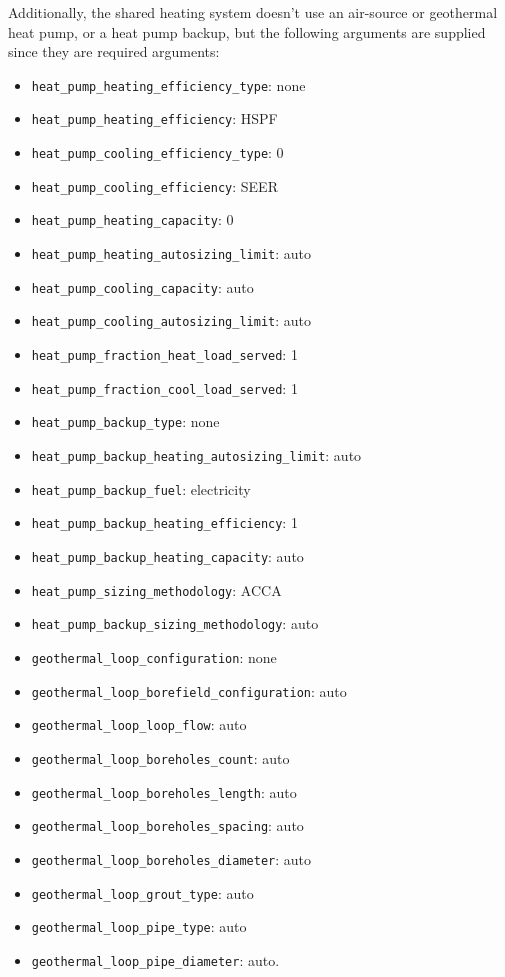 Additionally, the shared heating system doesn't use an air-source or geothermal heat pump, or a heat pump backup, but the following arguments are supplied since they are required arguments:
\begin{itemize}
    \item \texttt{heat\_pump\_heating\_efficiency\_type}: none
    \item \texttt{heat\_pump\_heating\_efficiency}: HSPF
    \item \texttt{heat\_pump\_cooling\_efficiency\_type}: 0
    \item \texttt{heat\_pump\_cooling\_efficiency}: SEER
    \item \texttt{heat\_pump\_heating\_capacity}: 0
    \item \texttt{heat\_pump\_heating\_autosizing\_limit}: auto
    \item \texttt{heat\_pump\_cooling\_capacity}: auto
    \item \texttt{heat\_pump\_cooling\_autosizing\_limit}: auto
    \item \texttt{heat\_pump\_fraction\_heat\_load\_served}: 1
    \item \texttt{heat\_pump\_fraction\_cool\_load\_served}: 1
    \item \texttt{heat\_pump\_backup\_type}: none
    \item \texttt{heat\_pump\_backup\_heating\_autosizing\_limit}: auto
    \item \texttt{heat\_pump\_backup\_fuel}: electricity
    \item \texttt{heat\_pump\_backup\_heating\_efficiency}: 1
    \item \texttt{heat\_pump\_backup\_heating\_capacity}: auto
    \item \texttt{heat\_pump\_sizing\_methodology}: ACCA
    \item \texttt{heat\_pump\_backup\_sizing\_methodology}: auto
    \item \texttt{geothermal\_loop\_configuration}: none
    \item \texttt{geothermal\_loop\_borefield\_configuration}: auto
    \item \texttt{geothermal\_loop\_loop\_flow}: auto
    \item \texttt{geothermal\_loop\_boreholes\_count}: auto
    \item \texttt{geothermal\_loop\_boreholes\_length}: auto
    \item \texttt{geothermal\_loop\_boreholes\_spacing}: auto
    \item \texttt{geothermal\_loop\_boreholes\_diameter}:  auto
    \item \texttt{geothermal\_loop\_grout\_type}:  auto
    \item \texttt{geothermal\_loop\_pipe\_type}:  auto
    \item \texttt{geothermal\_loop\_pipe\_diameter}: auto.

\end{itemize}

